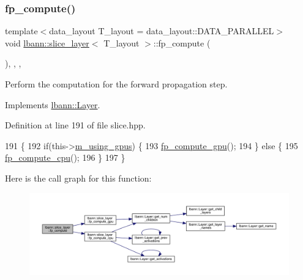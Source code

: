 \subsubsection{\texorpdfstring{fp\+\_\+compute()}{fp\_compute()}}
{\footnotesize\ttfamily template$<$data\+\_\+layout T\+\_\+layout = data\+\_\+layout\+::\+D\+A\+T\+A\+\_\+\+P\+A\+R\+A\+L\+L\+EL$>$ \\
void \hyperlink{classlbann_1_1slice__layer}{lbann\+::slice\+\_\+layer}$<$ T\+\_\+layout $>$\+::fp\+\_\+compute (\begin{DoxyParamCaption}{ }\end{DoxyParamCaption})\hspace{0.3cm}{\ttfamily [inline]}, {\ttfamily [override]}, {\ttfamily [protected]}, {\ttfamily [virtual]}}

Perform the computation for the forward propagation step. 

Implements \hyperlink{classlbann_1_1Layer_a523319dd1bd87a0612afa1912bb5aad7}{lbann\+::\+Layer}.



Definition at line 191 of file slice.\+hpp.


\begin{DoxyCode}
191                              \{
192     \textcolor{keywordflow}{if}(this->\hyperlink{classlbann_1_1Layer_af7881cb5eff5207c15fa835d65462e8f}{m\_using\_gpus}) \{
193       \hyperlink{classlbann_1_1slice__layer_a875347929b9e4c0a70749da0dbb6469e}{fp\_compute\_gpu}();
194     \} \textcolor{keywordflow}{else} \{
195       \hyperlink{classlbann_1_1slice__layer_ab4c95d24916534cdff58b32916171ff2}{fp\_compute\_cpu}();
196     \}
197   \}
\end{DoxyCode}
Here is the call graph for this function\+:\nopagebreak
\begin{figure}[H]
\begin{center}
\leavevmode
\includegraphics[width=350pt]{classlbann_1_1slice__layer_a4ade139cc44a7de47761680e1d44cb08_cgraph}
\end{center}
\end{figure}
\mbox{\label{classlbann_1_1slice__layer_ab4c95d24916534cdff58b32916171ff2}} 
